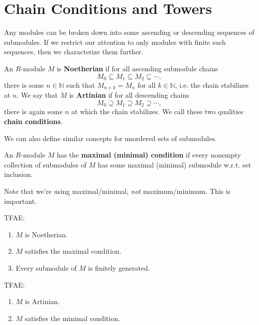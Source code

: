 \documentclass[twoside,10pt]{report}
\begin{document}
\section{Chain Conditions and Towers}

Any modules can be broken down into some ascending or descending sequences of submodules. If we restrict our attention to only modules with finite such sequences, then we characterize them further.

\begin{defn}[]
An $R$-module $M$ is \textbf{Noetherian} if for all ascending submodule chains
\[
M_0 \subseteq M_1 \subseteq M_2 \subseteq \cdots,
\] there is some $n \in \mathbb{N}$ such that $M_{n+k} = M_{n}$ for all $k \in \mathbb{N}$, i.e. the chain stabilizes at $n$. We say that $M$ is \textbf{Artinian} if for all descending chains
\[
M_0 \supseteq M_1 \supseteq M_2 \supseteq \cdots,
\] there is again some $n$ at which the chain stabilizes. We call these two qualities \textbf{chain conditions}.
\end{defn}

We can also define similar concepts for unordered sets of submodules.
\begin{defn}[]
	An $R$-module $M$ has the \textbf{maximal (minimal) condition} if every nonempty collection of submodules of $M$ has some maximal (minimal) submodule w.r.t. set inclusion.
\end{defn}

Note that we're using maximal/minimal, \textit{not} maximum/minimum. This is important.

\begin{thrm}[]
	TFAE:
	\begin{enumerate}
		\item $M$ is Noetherian.
		\item $M$ satisfies the maximal condition.
		\item Every submodule of $M$ is finitely generated.
	\end{enumerate}
\end{thrm}

\begin{thrm}[]
TFAE:
\begin{enumerate}
	\item $M$ is Artinian.
	\item $M$ satisfies the minimal condition.
\end{enumerate}
\end{thrm}
\end{document}
